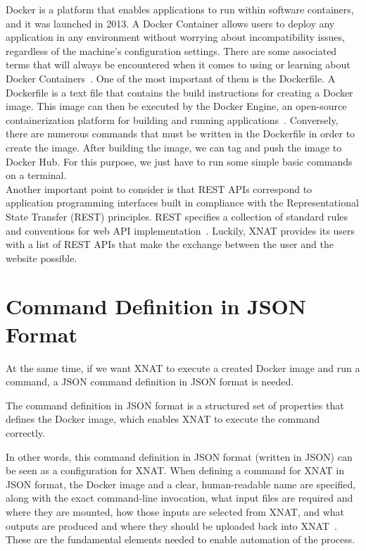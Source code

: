 Docker is a platform that enables applications to run within software containers, and it was launched in 2013. A Docker Container allows users to deploy any application in any environment without worrying about incompatibility issues, regardless of the machine’s configuration settings. There are some associated terms that will always be encountered when it comes to using or learning about Docker Containers~\cite{what_is_Docker_Container}.
One of the most important of them is the Dockerfile. A Dockerfile is a text file that contains the build instructions for creating a Docker image. This image can then be executed by the Docker Engine, an open-source containerization platform for building and running applications~\cite{DockerEngine}. Conversely, there are numerous commands that must be written in the Dockerfile in order to create the image. After building the image, we can tag and push the image to Docker Hub. For this purpose, we just have to run some simple basic commands on a terminal.
\\
Another important point to consider is that REST APIs correspond to application programming interfaces built in compliance with the Representational State Transfer (REST) principles.
REST specifies a collection of standard rules and conventions for web API implementation~\cite{REST_API}. Luckily, XNAT provides its users with a list of REST APIs that make the exchange between the user and the website possible. 

\section{Command Definition in JSON Format}
At the same time, if we want XNAT to execute a created Docker image and run a command, a \ac{JSON} command definition in JSON format is needed. 

The command definition in \ac{JSON} format is a structured set of properties that defines the Docker image, which enables XNAT to execute the command correctly.

In other words, this command definition in JSON format (written in JSON) can be seen as a configuration for XNAT. When defining a command for XNAT in JSON format, the Docker image and a clear, human-readable name are specified, along with the exact command-line invocation, what input files are required and where they are mounted, how those inputs are selected from XNAT, and what outputs are produced and where they should be uploaded back into XNAT~\cite{JSONCommand}.
These are the fundamental elements needed to enable automation of the process.


